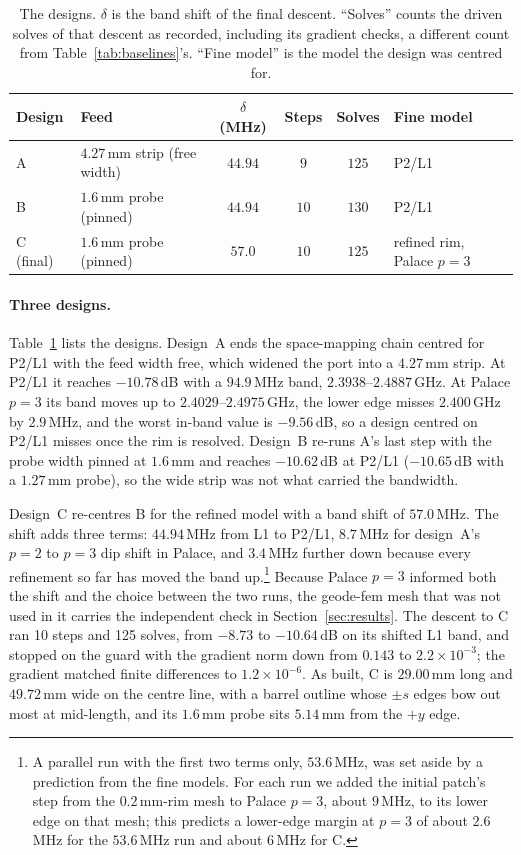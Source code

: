 \documentclass{anvil-paper}
\newcommand{\PL}{P2/L1}
\begin{document}
\begin{table}[t]
  \centering
  \caption{The designs. $\delta$ is the band shift of the final descent.
  ``Solves'' counts the driven solves of that descent as recorded,
  including its gradient checks, a different count from
  Table~\ref{tab:baselines}'s. ``Fine model'' is the model the design was
  centred for.}
  \label{tab:chain}
  \small
  \begin{tabular}{@{}l l c c c l@{}}
    \toprule
    Design & Feed & $\delta$ (MHz) & Steps & Solves & Fine model \\
    \midrule
    A & $4.27$\,mm strip (free width) & $44.94$ & $9$ & $125$ & \PL \\
    B & $1.6$\,mm probe (pinned) & $44.94$ & $10$ & $130$ & \PL \\
    C (final) & $1.6$\,mm probe (pinned) & $57.0$ & $10$ & $125$ & refined rim, Palace $p = 3$ \\
    \bottomrule
  \end{tabular}
\end{table}

\paragraph{Three designs.}
Table~\ref{tab:chain} lists the designs. Design~A ends the space-mapping
chain centred for \PL{} with the feed width free, which widened the port
into a $4.27$\,mm strip. At \PL{} it reaches $-10.78$\,dB with a
$94.9$\,MHz band, $2.3938$--$2.4887$\,GHz. At Palace $p = 3$ its band moves
up to $2.4029$--$2.4975$\,GHz, the lower edge misses $2.400$\,GHz by
$2.9$\,MHz, and the worst in-band value is $-9.56$\,dB, so a design centred
on \PL{} misses once the rim is resolved. Design~B re-runs A's last step
with the probe width pinned at $1.6$\,mm and reaches $-10.62$\,dB at \PL{}
($-10.65$\,dB with a $1.27$\,mm probe), so the wide strip was not what
carried the bandwidth.

Design~C re-centres B for the refined model with a band shift of
$57.0$\,MHz. The shift adds three terms: $44.94$\,MHz from L1 to \PL,
$8.7$\,MHz for design~A's $p = 2$ to $p = 3$ dip shift in Palace, and
$3.4$\,MHz further down because every refinement so far has moved the band
up.\footnote{A parallel run with the first two terms only, $53.6$\,MHz, was set
aside by a prediction from the fine models. For each run we added the
initial patch's step from the $0.2$\,mm-rim mesh to Palace $p = 3$, about
$9$\,MHz, to its lower edge on that mesh; this predicts a lower-edge margin
at $p = 3$ of about $2.6$\,MHz for the $53.6$\,MHz run and about $6$\,MHz for
C.} Because Palace $p = 3$ informed both the shift and the choice between
the two runs, the geode-fem mesh that was not used in it carries the
independent check in Section~\ref{sec:results}. The descent to C ran 10 steps and 125 solves, from
$-8.73$ to $-10.64$\,dB on its shifted L1 band, and stopped on the guard
with the gradient norm down from $0.143$ to $2.2\times10^{-3}$; the gradient
matched finite differences to $1.2\times10^{-6}$. As built, C is
$29.00$\,mm long and $49.72$\,mm wide on the centre line, with a barrel
outline whose $\pm s$ edges bow out most at mid-length, and its $1.6$\,mm
probe sits $5.14$\,mm from the $+y$ edge.
\end{document}
